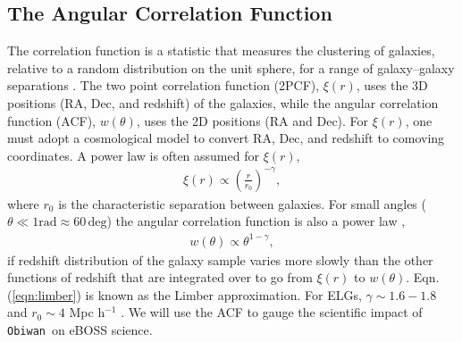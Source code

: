 \documentclass[a4paper,fleqn,usenatbib]{mnras}
\newcommand{\lp}{\left(}
\newcommand{\rp}{\right)}
\newcommand{\obiwan}{{\tt Obiwan}}
\begin{document}
\subsection{The Angular Correlation Function}
\label{sec:methods-cf}

The correlation function is a statistic that measures the clustering of galaxies, relative to a random distribution on the unit sphere, for a range of galaxy--galaxy separations \citep{peebles1980, corrfuncHamilton, weinberg, corrfuncErrors, corrfuncIC, corrfuncEboss}. The two point correlation function (2PCF), $\xi(r)$, uses the 3D positions (RA, Dec, and redshift) of the galaxies, while the angular correlation function (ACF), $w(\theta)$, uses the 2D positions (RA and Dec). For $\xi(r)$, one must adopt a cosmological model to convert RA, Dec, and redshift to comoving coordinates. A power law is often assumed for $\xi(r)$,
\begin{align}
\xi (r) \propto \lp\frac{r}{r_0}\rp^{-\gamma}, 
\end{align}
where $r_0$ is the characteristic separation between galaxies. For small angles ($\theta \ll 1 \text{rad} \approx 60 \, \text{deg}$) the angular correlation function is also a power law \citep{limberApprox}, 
\begin{align}
w(\theta) \propto \theta^{1-\gamma}, \label{eqn:limber}
\end{align}
if redshift distribution of the galaxy sample varies more slowly than the other functions of redshift that are integrated over to go from $\xi(r)$ to $w(\theta)$. Eqn. (\ref{eqn:limber}) is known as the Limber approximation. For ELGs, $\gamma \sim 1.6-1.8$ and $r_0 \sim 4$ Mpc h$^{-1}$ \citep{weinberg, corrfuncEboss}.
We will use the ACF to gauge the scientific impact of \obiwan\, on eBOSS science.
\end{document}
